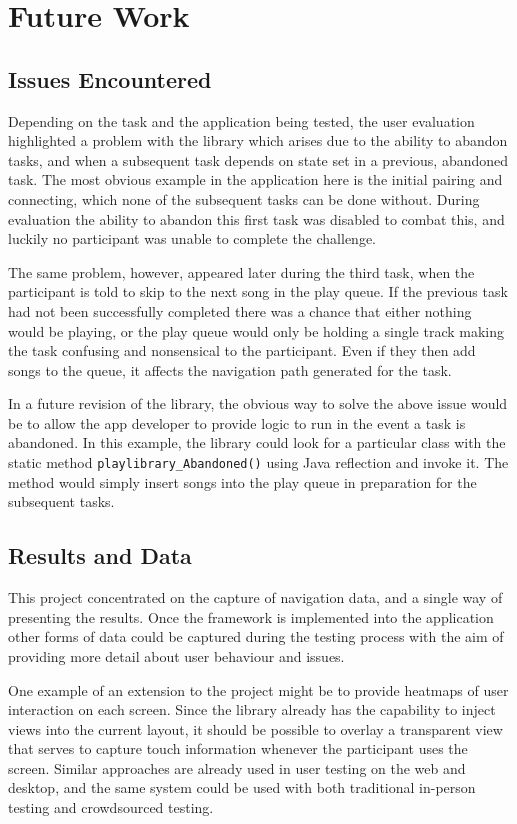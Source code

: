 \section{Future Work}

\subsection{Issues Encountered}

Depending on the task and the application being tested, the user 
evaluation highlighted a problem with the library which arises
due to the ability to abandon tasks, and when a subsequent task
depends on state set in a previous, abandoned task. The most 
obvious example in the application here is the initial pairing
and connecting, which none of the subsequent tasks can be done
without. During evaluation the ability to abandon this first task
was disabled to combat this, and luckily no participant was unable
to complete the challenge.

The same problem, however, appeared later during the third task, when
the participant is told to skip to the next song in the play queue.
If the previous task had not been successfully completed there was a
chance that either nothing would be playing, or the play queue would
only be holding a single track making the task confusing and nonsensical
to the participant. Even if they then add songs to the queue, it affects
the navigation path generated for the task.

In a future revision of the library, the obvious way to solve the above issue
would be to allow the app developer to provide logic to run in the event
a task is abandoned. In this example, the library could look for a
particular class with the static method \verb/playlibrary_Abandoned()/
using Java reflection and invoke it. The method would simply insert
songs into the play queue in preparation for the subsequent tasks.

\subsection{Results and Data}

This project concentrated on the capture of navigation data, and a single
way of presenting the results. Once the framework is implemented into the
application other forms of data could be captured during the testing
process with the aim of providing more detail about user behaviour and
issues.

One example of an extension to the project might be to provide heatmaps
of user interaction on each screen. Since the library already has the
capability to inject views into the current layout, it should be possible
to overlay a transparent view that serves to capture touch information
whenever the participant uses the screen. Similar approaches are already
used in user testing on the web and desktop, and the same system could
be used with both traditional in-person testing and crowdsourced testing.


